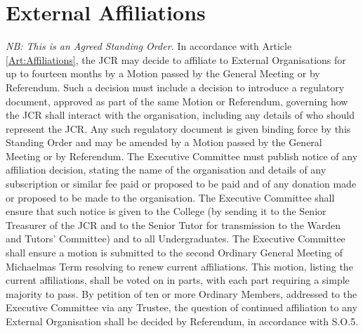 \chapter{External Affiliations}
\hspace*{-10pt}\textit{NB: This is an Agreed Standing Order.}
\npara In accordance with Article \ref{Art:Affiliations}, the JCR may decide to affiliate to External Organisations for up to fourteen months by a Motion passed by the General Meeting or by Referendum.  Such a decision must include a decision to introduce a regulatory document, approved as part of the same Motion or Referendum, governing how the JCR shall interact with the organisation, including any details of who should represent the JCR.  Any such regulatory document is given binding force by this Standing Order and may be amended by a Motion passed by the General Meeting or by Referendum.
\npara The Executive Committee must publish notice of any affiliation decision, stating the name of the organisation and details of any subscription or similar fee paid or proposed to be paid and of any donation made or proposed to be made to the organisation.  The Executive Committee shall ensure that such notice is given to the College (by sending it to the Senior Treasurer of the JCR and to the Senior Tutor for transmission to the Warden and Tutors' Committee) and to all Undergraduates.
\npara The Executive Committee shall ensure a motion is submitted to the second Ordinary General Meeting of Michaelmas Term resolving to renew current affiliations. This motion, listing the current affiliations, shall be voted on in parts, with each part requiring a simple majority to pass.
\npara By petition of ten or more Ordinary Members, addressed to the Executive Committee via any Trustee, the question of continued affiliation to any External Organisation shall be decided by Referendum, in accordance with S.O.5.
